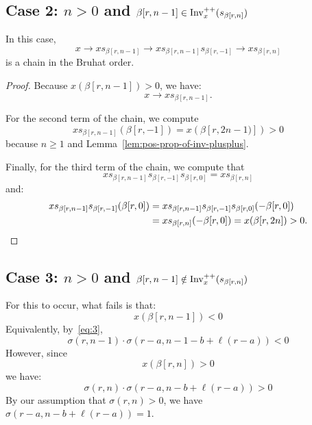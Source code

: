 \documentclass[10pt]{amsart}
\begin{document}
\subsection{Case 2: \texorpdfstring{$n > 0$}{n > 0} and \texorpdfstring{$ \beta[r,n-1] \in \operatorname{Inv}^{++}_x(s_{\beta[r,n]})$}{beta[r,n-1] in Invplusplusx(s beta[r,n])}}

In this case,
\begin{equation}\label{eq:49}
x \rightarrow x s_{\beta[r,n-1]} \rightarrow x s_{\beta[r,n-1]}s_{\beta[r,-1]} \rightarrow x s_{\beta[r,n]}
\end{equation}
is a chain in the Bruhat order.

\begin{proof}
Because $x(\beta[r,n-1])>0$, we have:
\begin{equation}\label{eq:52}
x \rightarrow x s_{\beta[r,n-1]}.
\end{equation}

For the second term of the chain, we compute
\begin{equation}\label{eq:53}
x s_{\beta[r,n-1]}(\beta[r,-1]) = x(\beta[r,2n-1)]) > 0
\end{equation}
because $n \geq 1$ and Lemma~\ref{lem:pos-prop-of-inv-plusplus}.

Finally, for the third term of the chain, we compute that
\begin{equation}\label{eq:54}
x s_{\beta[r,n-1]}s_{\beta[r,-1]}s_{\beta[r,0]} = x s_{\beta[r,n]}
\end{equation}
and:
\begin{align}\label{eq:56}
x s_{\beta[r,n-1]}s_{\beta[r,-1]}(\beta[r,0]) &= x s_{\beta[r,n-1]}s_{\beta[r,-1]}s_{\beta[r,0]}(- \beta[r,0])\\
&= xs_{\beta[r,n]}(- \beta[r,0]) = x(\beta[r,2n]) > 0.\notag\qedhere
\end{align}
\end{proof}

\subsection{Case 3: \texorpdfstring{$n > 0$}{n > 0} and \texorpdfstring{$ \beta[r,n-1] \notin \operatorname{Inv}^{++}_x(s_{\beta[r,n]})$}{beta[r,n-1] notin Invplusplusx(s beta[r,n])}}

For this to occur, what fails is that:
\begin{equation}\label{eq:41}
x(\beta[r,n-1]) < 0
\end{equation}
Equivalently, by~\eqref{eq:3},
\begin{equation}\label{eq:40}
\sigma(r,n-1) \cdot \sigma(r-a,n-1-b+\ell(r-a)) < 0
\end{equation}
However, since
\begin{equation}\label{eq:42}
x(\beta[r,n]) > 0
\end{equation}
we have:
\begin{equation}\label{eq:43}
\sigma(r,n) \cdot \sigma(r-a,n-b+\ell(r-a)) > 0
\end{equation}
By our assumption that $\sigma(r,n) > 0$, we have $\sigma(r-a,n-b+\ell(r-a)) = 1$.
\end{document}

